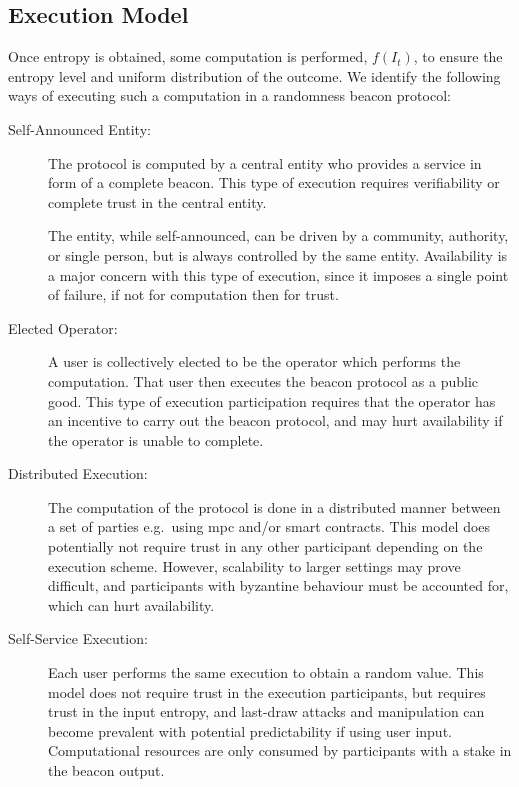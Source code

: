 \subsection{Execution Model}
Once entropy is obtained, some computation is performed, $f(I_t)$, to ensure the entropy level and uniform distribution of the outcome.
We identify the following ways of executing such a computation in a randomness beacon protocol:

\begin{description}
    \item[Self-Announced Entity:]
        The protocol is computed by a central entity who provides a service in form of a complete beacon.
        This type of execution requires verifiability or complete trust in the central entity.

        The entity, while self-announced, can be driven by a community, authority, or single person, but is always controlled by the same entity.
        Availability is a major concern with this type of execution, since it imposes a single point of failure, if not for computation then for trust.

    \item[Elected Operator:]
        A user is collectively elected to be the operator which performs the computation.
        That user then executes the beacon protocol as a public good.
        This type of execution participation requires that the operator has an incentive to carry out the beacon protocol, and may hurt availability if the operator is unable to complete.

    \item[Distributed Execution:]
        The computation of the protocol is done in a distributed manner between a set of parties e.g.\ using \gls{mpc} and/or smart contracts.
        This model does potentially not require trust in any other participant depending on the execution scheme.
        However, scalability to larger settings may prove difficult, and participants with byzantine behaviour must be accounted for, which can hurt availability.

    \item[Self-Service Execution:]
        Each user performs the same execution to obtain a random value.
        This model does not require trust in the execution participants, but requires trust in the input entropy, and last-draw attacks and manipulation can become prevalent with potential predictability if using user input.
        Computational resources are only consumed by participants with a stake in the beacon output.
\end{description}


